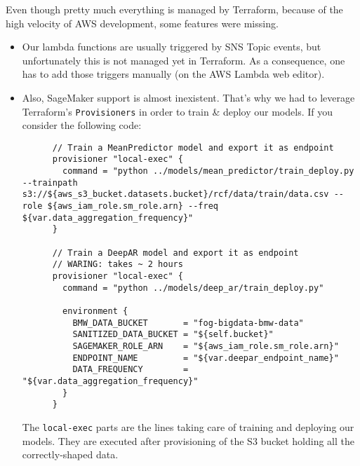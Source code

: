 Even though pretty much everything is managed by Terraform, because of the high velocity of AWS development, some features were missing.
\begin{itemize}
    \item Our lambda functions are usually triggered by SNS Topic events, but unfortunately this is not managed yet in Terraform. As a consequence, one has to add those triggers manually (on the AWS Lambda web editor).
    
    \item Also, SageMaker support is almost inexistent. That's why we had to leverage Terraform's \lstinline{Provisioners} in order to train \& deploy our models. If you consider the following code:
    
    \begin{lstlisting}
      // Train a MeanPredictor model and export it as endpoint
      provisioner "local-exec" {
        command = "python ../models/mean_predictor/train_deploy.py --trainpath s3://${aws_s3_bucket.datasets.bucket}/rcf/data/train/data.csv --role ${aws_iam_role.sm_role.arn} --freq ${var.data_aggregation_frequency}"
      }
    
      // Train a DeepAR model and export it as endpoint
      // WARING: takes ~ 2 hours
      provisioner "local-exec" {
        command = "python ../models/deep_ar/train_deploy.py"
    
        environment {
          BMW_DATA_BUCKET       = "fog-bigdata-bmw-data"
          SANITIZED_DATA_BUCKET = "${self.bucket}"
          SAGEMAKER_ROLE_ARN    = "${aws_iam_role.sm_role.arn}"
          ENDPOINT_NAME         = "${var.deepar_endpoint_name}"
          DATA_FREQUENCY        = "${var.data_aggregation_frequency}"
        }
      }
    \end{lstlisting}
    The \lstinline{local-exec} parts are the lines taking care of training and deploying our models. They are executed after provisioning of the S3 bucket holding all the correctly-shaped data.
\end{itemize}